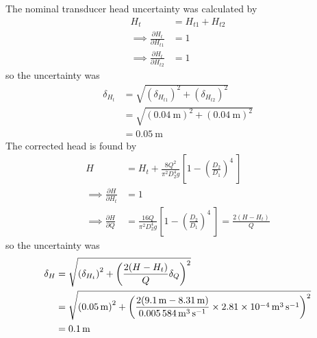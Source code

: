 The nominal transducer head uncertainty was calculated by
\begin{align*}
    H_t &= H_{t1} + H_{t2} \\
    \implies \frac{\partial H_t}{\partial H_{t1}} &= 1 \\
    \implies \frac{\partial H_t}{\partial H_{t2}} &= 1
\end{align*}
so the uncertainty was
\begin{align*}
    \delta_{H_t} &= \sqrt{\left(\delta_{H_{t1}}\right)^2 + \left(\delta_{H_{t2}}\right)^2} \\
    &= \sqrt{\left(\qty{0.04}{\meter}\right)^2 + \left(\qty{0.04}{\meter}\right)^2} \\
    &= \qty{0.05}{\meter}
\end{align*}
The corrected head is found by
\begin{align*}
    H &= H_t + \frac{8Q^2}{\pi^2 D_2^4 g} \left[1 - \left(\frac{D_2}{D_1}\right)^4\ \right] \\
    \implies \frac{\partial H}{\partial H_t} &= 1 \\
    \implies \frac{\partial H}{\partial Q} &= \frac{16Q}{\pi^2 D_2^4 g} \left[1 - \left(\frac{D_2}{D_1}\right)^4\ \right] = \frac{2(H - H_t)}{Q}
\end{align*}
so the uncertainty was
\begin{align*}
    \delta_H &= \sqrt{\left(\delta_{H_t}\right)^2 + \left(\frac{2(H - H_t)}{Q}\delta_Q\right)^2} \\
    &= \sqrt{\left(\qty{0.05}{\meter}\right)^2 + \left(\frac{2(\qty{9.1}{\meter} - \qty{8.31}{\meter})}{\qty{0.005584}{\meter\cubed\per\second}} \times \qty{2.81E-04}{\meter\cubed\per\second}\right)^2} \\
    &= \qty{0.1}{\meter}
\end{align*}

